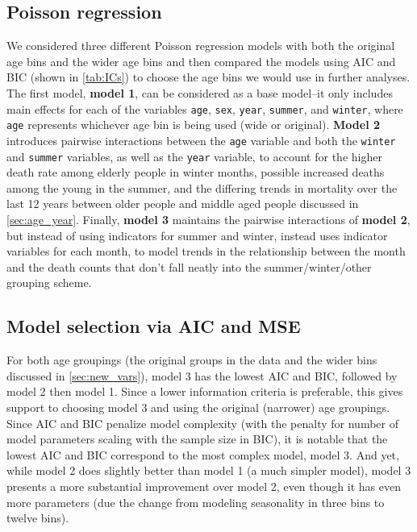 \documentclass[11pt]{article}
\begin{document}
\subsection{Poisson regression}\label{sec:poisson}

We considered three different Poisson regression models with both the original age bins and the wider age bins and then compared the models using AIC and BIC (shown in \cref{tab:ICs}) to choose the age bins we would use in further analyses. 
The first model, \textbf{model 1}, can be considered as a base model--it only includes main effects for each of the variables \verb+age+, \verb+sex+, \verb+year+, \verb+summer+, and \verb+winter+, where \verb+age+ represents whichever age bin is being used (wide or original). 
\textbf{Model 2} introduces pairwise interactions between the \verb+age+ variable and both the \verb+winter+ and \verb+summer+ variables, as well as the \verb+year+ variable, to account for the higher death rate among elderly people in winter months, possible increased deaths among the young in the summer, and the differing trends in mortality over the last 12 years between older people and middle aged people discussed in \cref{sec:age_year}.
Finally, \textbf{model 3} maintains the pairwise interactions of \textbf{model 2}, but instead of using indicators for summer and winter, instead uses indicator variables for each month, to model trends in the relationship between the month and the death counts that don't fall neatly into the summer/winter/other grouping scheme.



\subsection{Model selection via AIC and MSE}\label{sec:aic}

For both age groupings (the original groups in the data and the wider bins discussed in \cref{sec:new_vars}), model 3 has the lowest AIC and BIC, followed by model 2 then model 1. 
Since a lower information criteria is preferable, this gives support to choosing model 3 and using the original (narrower) age groupings.
Since AIC and BIC penalize model complexity (with the penalty for number of model parameters scaling with the sample size in BIC), it is notable that the lowest AIC and BIC correspond to the most complex model, model 3.
And yet, while model 2 does slightly better than model 1 (a much simpler model), model 3 presents a more substantial improvement over model 2, even though it has even more parameters (due the change from modeling seasonality in three bins to twelve bins).
\end{document}
